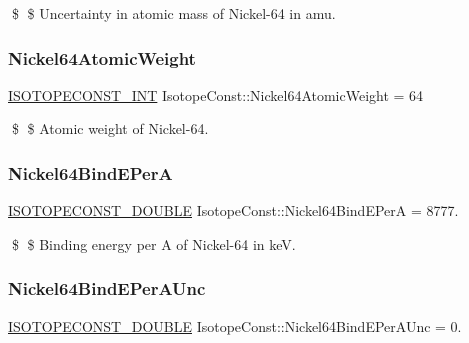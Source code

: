 \$ \$ Uncertainty in atomic mass of Nickel-\/64 in amu. \mbox{\label{group___isotope_const-_nickel-_ni64_ga0fa405f1003e6d1f2fceccee55b8de5f}} 
\subsubsection{\texorpdfstring{Nickel64\+Atomic\+Weight}{Nickel64AtomicWeight}}
{\footnotesize\ttfamily \mbox{\hyperlink{group___isotope_const-_macros_ga5f18360b3e99483a35c32d789e62621c}{I\+S\+O\+T\+O\+P\+E\+C\+O\+N\+S\+T\+\_\+\+I\+NT}} Isotope\+Const\+::\+Nickel64\+Atomic\+Weight = 64}

\$ \$ Atomic weight of Nickel-\/64. \mbox{\label{group___isotope_const-_nickel-_ni64_ga04a15fb26903a6fc5dd95c3240542e28}} 
\subsubsection{\texorpdfstring{Nickel64\+Bind\+E\+PerA}{Nickel64BindEPerA}}
{\footnotesize\ttfamily \mbox{\hyperlink{group___isotope_const-_macros_ga8f45a7272ce02c0b4c65c44636ed719a}{I\+S\+O\+T\+O\+P\+E\+C\+O\+N\+S\+T\+\_\+\+D\+O\+U\+B\+LE}} Isotope\+Const\+::\+Nickel64\+Bind\+E\+PerA = 8777.}

\$ \$ Binding energy per A of Nickel-\/64 in keV. \mbox{\label{group___isotope_const-_nickel-_ni64_ga8b16e93233d8805cb08302ce254d9f50}} 
\subsubsection{\texorpdfstring{Nickel64\+Bind\+E\+Per\+A\+Unc}{Nickel64BindEPerAUnc}}
{\footnotesize\ttfamily \mbox{\hyperlink{group___isotope_const-_macros_ga8f45a7272ce02c0b4c65c44636ed719a}{I\+S\+O\+T\+O\+P\+E\+C\+O\+N\+S\+T\+\_\+\+D\+O\+U\+B\+LE}} Isotope\+Const\+::\+Nickel64\+Bind\+E\+Per\+A\+Unc = 0.}

